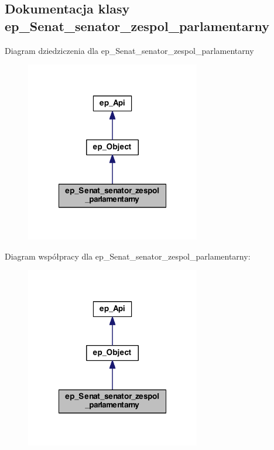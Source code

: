 \hypertarget{classep___senat__senator__zespol__parlamentarny}{\subsection{Dokumentacja klasy ep\-\_\-\-Senat\-\_\-senator\-\_\-zespol\-\_\-parlamentarny}
\label{classep___senat__senator__zespol__parlamentarny}
}


Diagram dziedziczenia dla ep\-\_\-\-Senat\-\_\-senator\-\_\-zespol\-\_\-parlamentarny\nopagebreak
\begin{figure}[H]
\begin{center}
\leavevmode
\includegraphics[width=216pt]{classep___senat__senator__zespol__parlamentarny__inherit__graph}
\end{center}
\end{figure}


Diagram współpracy dla ep\-\_\-\-Senat\-\_\-senator\-\_\-zespol\-\_\-parlamentarny\-:\nopagebreak
\begin{figure}[H]
\begin{center}
\leavevmode
\includegraphics[width=216pt]{classep___senat__senator__zespol__parlamentarny__coll__graph}
\end{center}
\end{figure}
